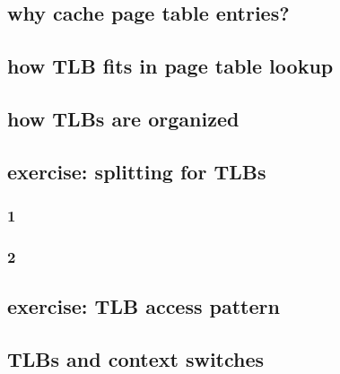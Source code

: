 \subsection{why cache page table entries?}


\subsection{how TLB fits in page table lookup}


\subsection{how TLBs are organized}

\subsection{exercise: splitting for TLBs}
\subsubsection{1}

\subsubsection{2}



\subsection{exercise: TLB access pattern}




\subsection{TLBs and context switches}


